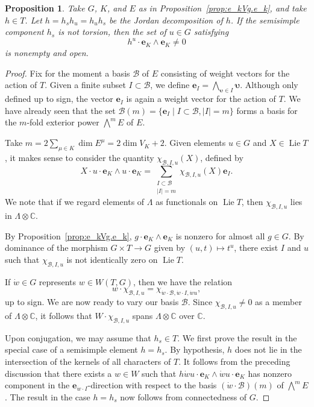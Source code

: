 \documentclass{amsart}
\theoremstyle{plain}
\newtheorem{proposition}[theorem]{Proposition}
\theoremstyle{definition}
\theoremstyle{remark}
\DeclareMathOperator{\Lie}{Lie}
\newcommand{\Vect}[1]{\mathbold{#1}}
\providecommand{\abs}[1]{\lvert#1\rvert}
\begin{document}
\begin{proposition}\label{prop:h_u.eVe}
Take $G$, $K$, and $E$ as in Proposition~\ref{prop:e_kVg.e_k}, and take $h \in T$. 
Let $h = h_{s}h_{u} = h_{u}h_{s}$ be the Jordan decomposition of $h$.
If the semisimple component
$h_{s}$ is not torsion, then
the set of $u
\in G$ satisfying $$
h^{u} \cdot \Vect{e}_{K} \wedge \Vect{e}_{K} \neq 0$$
is nonempty and open.
\end{proposition}
\begin{proof}
Fix for the moment a basis $\mathscr{B}$ of $E$ consisting of weight vectors for the action
of $T$. Given a finite subset $I \subset \mathscr{B}$, we define
$\Vect{e}_{I} = \bigwedge_{\Vect{\upsilon} \in I} \Vect{\upsilon}$. Although only
defined up to sign, the vector $\Vect{e}_{I}$ is again a weight vector for the action of
$T$. We have already seen that the set $\mathscr{B}(m) = \{\Vect{e}_{I} \mid I \subset
\mathscr{B}, \abs{I} = m\}$ forms a basis for the $m$-fold exterior power $\textstyle{\bigwedge^{\!m}} E$ of $E$.

Take $m = 2 \sum_{\mu \in K} \dim E^{\mu} = 2 \dim V_{K} + 2$. Given elements
$u \in G$ and $X \in \Lie T$, it makes sense to consider the quantity
$\chi_{\mathscr{B}, I, u}(X)$, defined by
$$X \cdot u \cdot \Vect{e}_{K} \wedge u \cdot \Vect{e}_{K}
= \sum_{\substack{I \subset \mathscr{B}\\ \abs{I} = m}} \chi_{\mathscr{B}, I, u}(X)
\Vect{e}_{I}.$$
We note that if we regard elements of $\Lambda$ as functionals on $\Lie T$, then $\chi_{\mathscr{B}, I,
u}$ lies in $\Lambda \otimes \mathbb{C}$.

By Proposition~\ref{prop:e_kVg.e_k}, $g \cdot \Vect{e}_{K} \wedge
\Vect{e}_{K}$ is nonzero for almost all $g \in G$. By dominance of the morphism $G \times
T \to G$ given by $(u, t) \mapsto t^{u}$, there exist $I$ and $u$ such that $\chi_{\mathscr{B}, I, u}$ is not identically zero on $\Lie
T$.

If $\dot{w} \in G$ represents $w \in W(T, G)$, then we have the relation
$$w \cdot \chi_{\mathscr{B}, I, u} = \chi_{\dot{w} \cdot \mathscr{B}, \dot{w} \cdot I, \dot{w}u},$$
up to sign. We are now ready
to vary our basis $\mathscr{B}$. Since $\chi_{\mathscr{B}, I, u} \neq 0$ as a member of
$\Lambda \otimes \mathbb{C}$, it follows that $W \cdot \chi_{\mathscr{B}, I, u}$ spans 
$\Lambda \otimes \mathbb{C}$ over $\mathbb{C}$.

Upon conjugation, we may assume that $h_{s} \in T$.
We first prove the result in the special case of a semisimple element $h = h_{s}$.
By hypothesis, $h$ does not lie in the intersection of the kernels of all characters of
$T$. It follows from the preceding discussion that there exists a $w \in W$ such that
$h\dot{w}u \cdot \Vect{e}_{K} \wedge \dot{w}u \cdot \Vect{e}_{K}$ has nonzero component
in the $\Vect{e}_{\dot{w} \cdot I}$-direction with respect to the basis $(\dot{w} \cdot \mathscr{B})(m)$ of $\textstyle{\bigwedge^{\!m}}
E$. The result in the case $h = h_{s}$ now follows from connectedness of $G$.


\end{proof}
\end{document}
